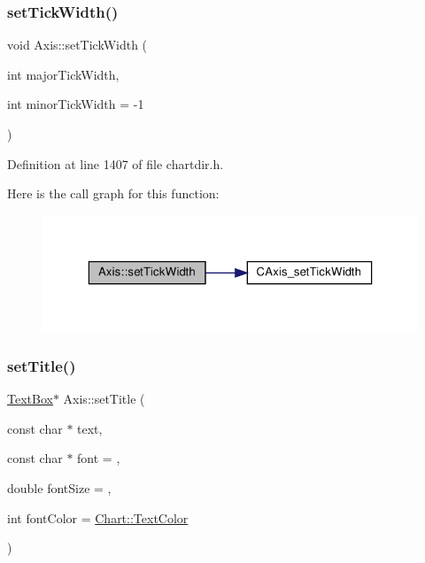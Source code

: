 \subsubsection{\texorpdfstring{set\+Tick\+Width()}{setTickWidth()}}
{\footnotesize\ttfamily void Axis\+::set\+Tick\+Width (\begin{DoxyParamCaption}\item[{int}]{major\+Tick\+Width,  }\item[{int}]{minor\+Tick\+Width = {\ttfamily -\/1} }\end{DoxyParamCaption})\hspace{0.3cm}{\ttfamily [inline]}}



Definition at line 1407 of file chartdir.\+h.

Here is the call graph for this function\+:
\nopagebreak
\begin{figure}[H]
\begin{center}
\leavevmode
\includegraphics[width=323pt]{class_axis_a62799546985d8e3839515dacc54ffcdc_cgraph}
\end{center}
\end{figure}
\mbox{\label{class_axis_ac18e569a6c1b55500ed72c31dd516db7}} 
\subsubsection{\texorpdfstring{set\+Title()}{setTitle()}}
{\footnotesize\ttfamily \hyperlink{class_text_box}{Text\+Box}$\ast$ Axis\+::set\+Title (\begin{DoxyParamCaption}\item[{const char $\ast$}]{text,  }\item[{const char $\ast$}]{font = {},  }\item[{double}]{font\+Size = {},  }\item[{int}]{font\+Color = {\ttfamily \hyperlink{namespace_chart_abee0d882fdc9ad0b001245ad9fc64011a879e14f2f5024caccc047374342321ef}{Chart\+::\+Text\+Color}} }\end{DoxyParamCaption})\hspace{0.3cm}{\ttfamily [inline]}}



